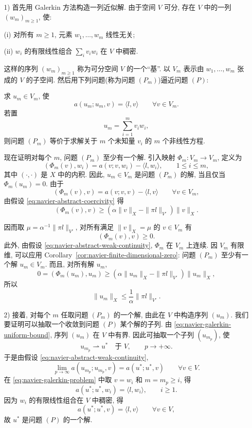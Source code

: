 \begin{Proof}
1) 首先用 Galerkin 方法构造一列近似解.
由于空间 $V$ 可分, 存在 $V$ 中的一列 $(w_m)_{m\geq1}$, 使:

\textup{(i)} 对所有 $m\geq1$, 元素 $w_1,\ldots,w_m$ 线性无关;

\textup{(ii)} $w_i$ 的有限线性组合 $\sum_i v_iw_i$ 在 $V$ 中稠密.

这样的序列 $(w_m)_{m\geq1}$ 称为可分空间 $V$ 的一个``基''.
以 $V_m$ 表示由 $w_1,\ldots,w_m$ 张成的 $V$ 的子空间.
然后用下列问题(称为问题 $(P_m)$)逼近问题 $(P)$:

求 $u_m\in V_m$, 使
\begin{equation}\label{eq:navier-galerkin-problem}
a(u_m;u_m,v)=\langle l,v\rangle
\qquad\forall v\in V_m.
\end{equation}
若置
\[
u_m=\sum_{i=1}^m v_iw_i,
\]
则问题 $(P_m)$ 等价于求解关于 $m$ 个未知量 $v_i$ 的 $m$ 个非线性方程.

现在证明对每个 $m$, 问题 $(P_m)$ 至少有一个解.
引入映射 $\Phi_m:V_m\to V_m$, 定义为
\[
(\Phi_m(v),w_i)=a(v;v,w_i)-\langle l,w_i\rangle,
\qquad1\leq i\leq m,
\]
其中 $(\cdot,\cdot)$ 是 $X$ 中的内积.
因此, $u_m\in V_m$ 是问题 $(P_m)$ 的解, 当且仅当 $\Phi_m(u_m)=0$.
由于
\[
(\Phi_m(v),v)=a(v;v,v)-\langle l,v\rangle
\qquad\forall v\in V_m,
\]
由假设 \eqref{eq:navier-abstract-coercivity} 得
\[
(\Phi_m(v),v)\geq
(\alpha\|v\|_X-\|\pi l\|_{V'})\|v\|_X.
\]

因而取 $\mu=\alpha^{-1}\|\pi l\|_{V'}$, 对所有满足
$\|v\|_X=\mu$ 的 $v\in V_m$ 有
\[
(\Phi_m(v),v)\geq0.
\]
此外, 由假设 \eqref{eq:navier-abstract-weak-continuity},
$\Phi_m$ 在 $V_m$ 上连续. 因 $V_m$ 有限维,
可以应用 Corollary~\ref{cor:navier-finite-dimensional-zero}:
问题 $(P_m)$ 至少有一个解 $u_m\in V_m$.
而且, 对所有解 $u_m$,
\[
0=(\Phi_m(u_m),u_m)
\geq(\alpha\|u_m\|_X-\|\pi l\|_{V'})\|u_m\|_X,
\]
所以
\begin{equation}\label{eq:navier-galerkin-uniform-bound}
\|u_m\|_X\leq\frac1\alpha\|\pi l\|_{V'}.
\end{equation}

2) 接着, 对每个 $m$ 任取问题 $(P_m)$ 的一个解,
由此在 $V$ 中构造序列 $(u_m)$. 我们要证明可以抽取一个收敛到问题 $(P)$ 某个解的子列.
由 \eqref{eq:navier-galerkin-uniform-bound}, 序列 $(u_m)$ 在 $V$ 中有界.
因此可抽取一个子列 $(u_{m_p})$, 使
\[
u_{m_p}\rightharpoonup u^*\quad\text{于 }V,
\qquad p\to+\infty.
\]
于是由假设 \eqref{eq:navier-abstract-weak-continuity},
\[
\lim_{p\to\infty}a(u_{m_p};u_{m_p},v)
=a(u^*;u^*,v)
\qquad\forall v\in V.
\]
在 \eqref{eq:navier-galerkin-problem} 中取 $v=w_i$ 和 $m=m_p\geq i$, 得
\[
a(u^*;u^*,w_i)=\langle l,w_i\rangle,
\qquad i\geq1.
\]
因为 $w_i$ 的有限线性组合在 $V$ 中稠密, 得
\[
a(u^*;u^*,v)=\langle l,v\rangle
\qquad\forall v\in V,
\]
故 $u^*$ 是问题 $(P)$ 的一个解.
\end{Proof}

